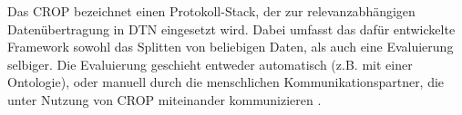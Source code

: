 Das \gls{CROP} bezeichnet einen Protokoll-Stack, der zur relevanzabh{\"a}ngigen
Daten{\"u}bertragung in \gls{DTN} eingesetzt wird. Dabei
umfasst das daf{\"u}r entwickelte Framework sowohl das Splitten von beliebigen
Daten, als auch eine Evaluierung selbiger. Die Evaluierung geschieht entweder
automatisch (z.B. mit einer Ontologie), oder manuell durch die menschlichen
Kommunikationspartner, die unter Nutzung von CROP miteinander kommunizieren
\cite{Daher}.
